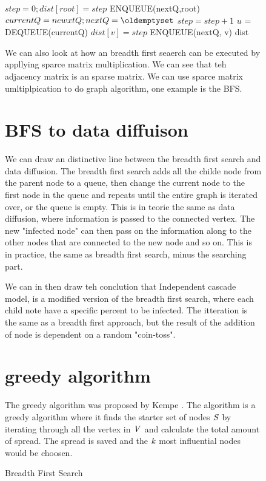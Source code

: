 \begin{figure}[!ht]
\begin{algorithm}
\caption{Breadth First Search}
\begin{algorithmic}[1]
\State $step = 0; dist[root] = step$
\State ENQUEUE(nextQ,root)
\State $currentQ = newxtQ; nextQ = \oldemptyset$
\State $step = step+1$
\State$ u$ = DEQUEUE(currentQ)
\State $dist[v] = step$
\State ENQUEUE(nextQ, v)
\EndIf
\EndFor
\EndWhile
\EndWhile
\Return dist
\end{algorithmic}
\end{algorithm}

We can also look at how an breadth first seaerch can be executed by appllying  sparce matrix multiplication. We can see that teh adjacency matrix is an sparse matrix. We can use sparce matrix umltiplpication to do graph algorithm, one example is the BFS. 


\section{BFS to data diffuison}
We can draw an distinctive line between the breadth first search and data diffusion. The breadth first search adds all the childe node from the parent node to a queue, then change the current node to the first node in the queue and repeats until the entire graph is iterated over, or the queue is empty. This is in teorie the same as data diffusion, where information is passed to the connected vertex. The new "infected node" can then pass on the information along to the other nodes that are connected to the new node and so on. This is in practice, the same as breadth first search, minus the searching part. 

We can in then draw teh conclution that Independent cascade model, is a modified version of the breadth first search, where each child note have a specific percent to be infected. The itteration is the same as a breadth first approach, but the result of the addition of node is dependent on a random "coin-toss".


\section{greedy algorithm}
The  greedy algorithm was proposed by Kempe \cite{MaximizeSpread2015}. The algorithm is a greedy algorithm where it finds the starter set of nodes $\it{S}$ by iterating through all the vertex in $\it{V}$ and calculate the total amount of spread. The spread is saved and the $\it{k}$ most influential nodes would be choosen.


\end{figure}
